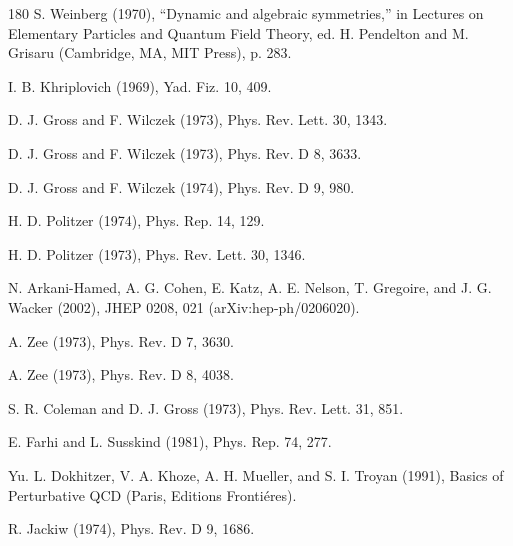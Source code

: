\begin{thebibliography}{180}
 S. Weinberg (1970), ``Dynamic and algebraic symmetries,'' in Lectures on Elementary Particles and Quantum Field Theory, ed. H. Pendelton and M. Grisaru (Cambridge, MA, MIT Press), p. 283.

 I. B. Khriplovich (1969), Yad. Fiz. 10, 409.

 D. J. Gross and F. Wilczek (1973), Phys. Rev. Lett. 30, 1343.

 D. J. Gross and F. Wilczek (1973), Phys. Rev. D 8, 3633.

 D. J. Gross and F. Wilczek (1974), Phys. Rev. D 9, 980.

 H. D. Politzer (1974), Phys. Rep. 14, 129.

 H. D. Politzer (1973), Phys. Rev. Lett. 30, 1346.

 N. Arkani-Hamed, A. G. Cohen, E. Katz, A. E. Nelson, T. Gregoire, and J. G. Wacker (2002), JHEP 0208, 021 (arXiv:hep-ph/0206020).

 A. Zee (1973), Phys. Rev. D 7, 3630.

 A. Zee (1973), Phys. Rev. D 8, 4038.

 S. R. Coleman and D. J. Gross (1973), Phys. Rev. Lett. 31, 851.

 E. Farhi and L. Susskind (1981), Phys. Rep. 74, 277.

 Yu. L. Dokhitzer, V. A. Khoze, A. H. Mueller, and S. I. Troyan (1991), Basics of Perturbative QCD (Paris, Editions Frontiéres).

 R. Jackiw (1974), Phys. Rev. D 9, 1686.


\end{thebibliography}
